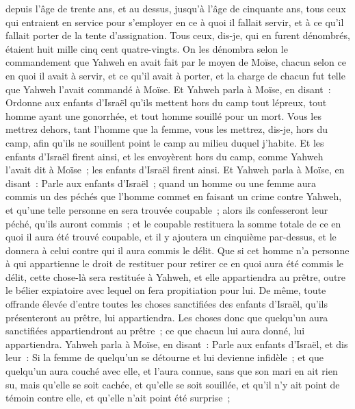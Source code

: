\begin{multicols}{2}
depuis l'âge de trente ans, et au dessus, jusqu'à l'âge de cinquante ans, tous ceux qui entraient en service pour s'employer en ce à quoi il fallait servir, et à ce qu'il fallait porter de la tente d'assignation.
Tous ceux, dis-je, qui en furent dénombrés, étaient huit mille cinq cent quatre-vingts.
On les dénombra selon le commandement que Yahweh en avait fait par le moyen de Moïse, chacun selon ce en quoi il avait à servir, et ce qu'il avait à porter, et la charge de chacun fut telle que Yahweh l'avait commandé à Moïse.
\VerseOne{}Et Yahweh parla à Moïse, en disant~:
Ordonne aux enfants d'Israël qu'ils mettent hors du camp tout lépreux, tout homme ayant une gonorrhée, et tout homme souillé pour un mort.
Vous les mettrez dehors, tant l'homme que la femme, vous les mettrez, dis-je, hors du camp, afin qu'ils ne souillent point le camp au milieu duquel j'habite.
Et les enfants d'Israël firent ainsi, et les envoyèrent hors du camp, comme Yahweh l'avait dit à Moïse~; les enfants d'Israël firent ainsi.
Et Yahweh parla à Moïse, en disant~:
Parle aux enfants d'Israël~; quand un homme ou une femme aura commis un des péchés que l'homme commet en faisant un crime contre Yahweh, et qu'une telle personne en sera trouvée coupable~;
alors ils confesseront leur péché, qu'ils auront commis~; et le coupable restituera la somme totale de ce en quoi il aura été trouvé coupable, et il y ajoutera un cinquième par-dessus, et le donnera à celui contre qui il aura commis le délit.
Que si cet homme n'a personne à qui appartienne le droit de restituer pour retirer ce en quoi aura été commis le délit, cette chose-là sera restituée à Yahweh, et elle appartiendra au prêtre, outre le bélier expiatoire avec lequel on fera propitiation pour lui.
De même, toute offrande élevée d'entre toutes les choses sanctifiées des enfants d'Israël, qu'ils présenteront au prêtre, lui appartiendra.
 Les choses donc que quelqu'un aura sanctifiées appartiendront au prêtre~; ce que chacun lui aura donné, lui appartiendra.
Yahweh parla à Moïse, en disant~:
Parle aux enfants d'Israël, et dis leur~: Si la femme de quelqu'un se détourne et lui devienne infidèle~;
et que quelqu'un aura couché avec elle, et l'aura connue, sans que son mari en ait rien su, mais qu'elle se soit cachée, et qu'elle se soit souillée, et qu'il n'y ait point de témoin contre elle, et qu'elle n'ait point été surprise~;

\end{multicols}

